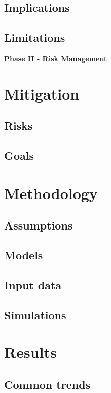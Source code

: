 \documentclass[11pt,a4paper]{article}
\begin{document}
\subsection{Implications}
\subsection{Limitations}

\newpage

\begin{center}
    \textbf{\Large Phase II - Risk Management}
\end{center}

\newpage

\section{Mitigation}
\subsection{Risks}
\subsection{Goals}

\newpage

\section{Methodology}
\subsection{Assumptions}
\subsection{Models}
\subsection{Input data}
\subsection{Simulations}

\newpage

\section{Results} 
\subsection{Common trends}
\end{document}
